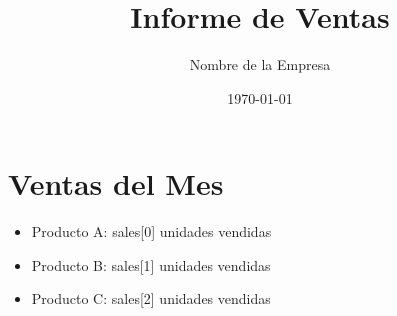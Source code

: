 \documentclass{article}
\begin{document}
\title{Informe de Ventas}
\author{Nombre de la Empresa}
\date{\today}
\maketitle

\section{Ventas del Mes}

\begin{itemize}
    \item Producto A: {{ sales[0] }} unidades vendidas
    \item Producto B: {{ sales[1] }} unidades vendidas
    \item Producto C: {{ sales[2] }} unidades vendidas
\end{itemize}
\end{document}
